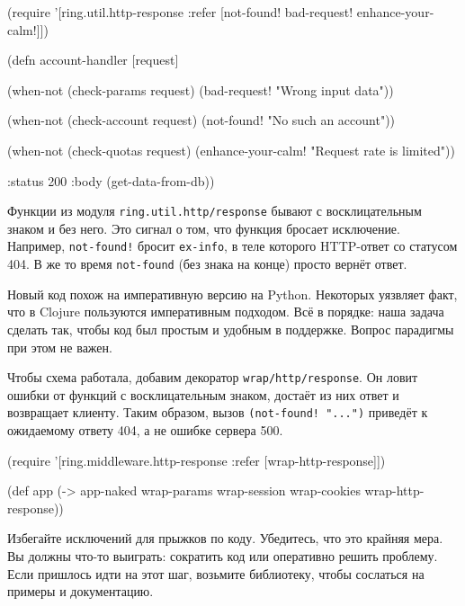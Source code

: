 \begin{english}
  \begin{clojure}
(require '[ring.util.http-response
           :refer [not-found!
                   bad-request!
                   enhance-your-calm!]])

(defn account-handler [request]

  (when-not (check-params request)
    (bad-request! "Wrong input data"))

  (when-not (check-account request)
    (not-found! "No such an account"))

  (when-not (check-quotas request)
    (enhance-your-calm! "Request rate is limited"))

  {:status 200
   :body (get-data-from-db)})
  \end{clojure}
\end{english}

\fi

\fi

\fi

Функции из модуля \texttt{ring.util.http\-/response} бывают с восклицательным
знаком и без него. Это сигнал о том, что функция бросает исключение. Например,
\verb|not-found!| бросит \verb|ex-info|, в теле которого HTTP-ответ со статусом
404. В же то время \verb|not-found| (без знака на конце) просто вернёт ответ.

Новый код похож на императивную версию на Python. Некоторых уязвляет факт, что в
Clojure пользуются императивным подходом. Всё в порядке: наша задача сделать
так, чтобы код был простым и удобным в поддержке. Вопрос парадигмы при этом не
важен.


Чтобы схема работала, добавим декоратор \texttt{wrap\-/http\-/response}. Он ловит
ошибки от функций с восклицательным знаком, достаёт из них ответ и возвращает
клиенту. Таким образом, вызов \verb|(not-found! "...")| приведёт к ожидаемому
ответу 404, а не ошибке сервера 500.

\begin{english}
  \begin{clojure}
(require '[ring.middleware.http-response
           :refer [wrap-http-response]])

(def app
  (-> app-naked
      wrap-params
      wrap-session
      wrap-cookies
      wrap-http-response))
  \end{clojure}
\end{english}

Избегайте исключений для прыжков по коду. Убедитесь, что это крайняя мера. Вы
должны что-то выиграть: сократить код или оперативно решить проблему. Если
пришлось идти на этот шаг, возьмите библиотеку, чтобы сослаться на примеры и
документацию.

